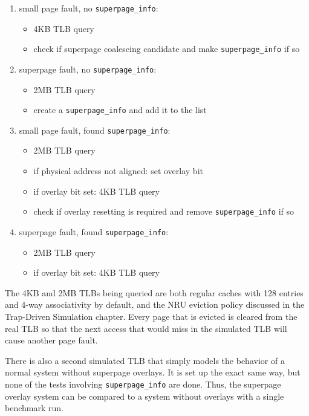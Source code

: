 \begin{enumerate}
\item small page fault, no \verb|superpage_info|:
\begin{itemize}
  \item 4KB TLB query
  \item check if superpage coalescing candidate and make \verb|superpage_info| if so
\end{itemize}

\item superpage fault, no \verb|superpage_info|:
\begin{itemize}
  \item 2MB TLB query
  \item create a \verb|superpage_info| and add it to the list
\end{itemize}

\item small page fault, found \verb|superpage_info|:
\begin{itemize}
  \item 2MB TLB query
  \item if physical address not aligned: set overlay bit
  \item if overlay bit set: 4KB TLB query
  \item check if overlay resetting is required and remove \verb|superpage_info| if so
\end{itemize}

\item superpage fault, found \verb|superpage_info|:
\begin{itemize}
  \item 2MB TLB query
  \item if overlay bit set: 4KB TLB query
\end{itemize}
\end{enumerate}

The 4KB and 2MB TLBs being queried are both regular caches with 128 entries and 4-way associativity by default, and the NRU eviction policy discussed in the Trap-Driven Simulation chapter. Every page that is evicted is cleared from the real TLB so that the next access that would miss in the simulated TLB will cause another page fault.

There is also a second simulated TLB that simply models the behavior of a normal system without superpage overlays. It is set up the exact same way, but none of the tests involving \verb|superpage_info| are done. Thus, the superpage overlay system can be compared to a system without overlays with a single benchmark run.

